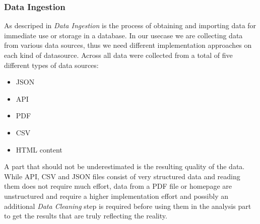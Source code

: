 \subsubsection{Data Ingestion}
\label{subsubsec:ingestion}
As descriped in\cite{ingestion} \textit{Data Ingestion} is the process of obtaining and importing data for immediate use or storage in a database.
In our usecase we are collecting data from various data sources, thus we need different implementation approaches on each kind of datasource.
\newline
Across all  data were collected from a total of five different types of data sources:
\begin{itemize}
  \item \ac{JSON}
  \item \ac{API}
  \item \acs{PDF}
  \item \ac{CSV}
  \item \acs{HTML} content
\end{itemize}
A part that should not be underestimated is the resulting quality of the data.
While \ac{API}, \ac{CSV} and \ac{JSON} files consist of very structured data and reading them does not require much effort,
data from a \ac{PDF} file or homepage are unstructured and require a higher implementation effort and possibly an additional
\textit{Data Cleaning} step is required before using them in the analysis part to get the results that are truly reflecting the reality.
%
